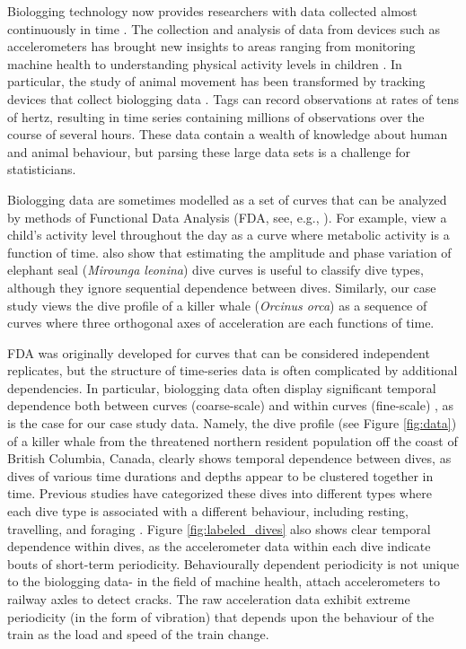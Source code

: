 Biologging technology now provides researchers with data collected almost continuously in time \citep{Hooten:2017}.
The collection and analysis of data from devices such as accelerometers has brought new insights to areas ranging from monitoring machine health \citep{Getman:2009} to understanding physical activity levels in children \citep{Morris:2007}. In particular, the study of animal movement has been transformed by tracking devices that collect biologging data \citep{Borger:2020}. Tags can record observations at rates of tens of hertz, resulting in time series containing millions of observations over the course of several hours. These data contain a wealth of knowledge about human and animal behaviour, but parsing these large data sets is a challenge for statisticians.

Biologging data are sometimes modelled as a set of curves that can be analyzed by methods of Functional Data Analysis (FDA, see, e.g., \citealt{Ramsay:2005}). For example, \cite{Morris:2007} view a child's activity level throughout the day as a curve where metabolic activity is a function of time. \citet{Fu:2017} also show that estimating the amplitude and phase variation of elephant seal (\textit{Mirounga leonina}) dive curves is useful to classify dive types, although they ignore sequential dependence between dives. Similarly, our case study views the dive profile of a killer whale (\textit{Orcinus orca}) as a sequence of curves where three orthogonal axes of acceleration are each functions of time.

FDA was originally developed for curves that can be considered independent replicates, but the structure of time-series data is often complicated by additional dependencies. In particular, biologging data often display significant temporal dependence both between curves (coarse-scale) and within curves (fine-scale) \citep{Barajas:2017,Adam:2019}, as is the case for our case study data. Namely, the dive profile (see Figure \ref{fig:data}) of a killer whale from the threatened northern resident population off the coast of British Columbia, Canada, clearly shows temporal dependence between dives, as dives of various time durations and depths appear to be clustered together in time. Previous studies have categorized these dives into different types where each dive type is associated with a different behaviour, including resting, travelling, and foraging \citep{Tennessen:2019b}.
Figure {\ref{fig:labeled_dives}} also shows clear temporal dependence within dives, as the accelerometer data within each dive indicate bouts of short-term periodicity. Behaviourally dependent periodicity is not unique to the biologging data- in the field of machine health, \citet{Lucero:2019} attach accelerometers to railway axles to detect cracks. The raw acceleration data exhibit extreme periodicity (in the form of vibration) that depends upon the behaviour of the train as the load and speed of the train change.

